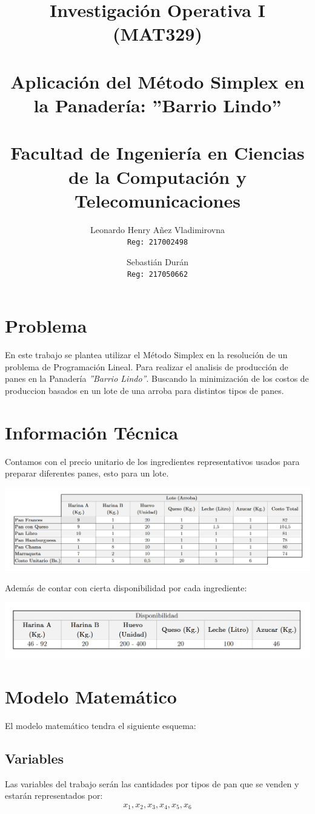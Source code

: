 \documentclass[10pt,letterpaper]{book}
\author{
Leonardo Henry Añez Vladimirovna\\
\texttt{Reg: 217002498}
\and
Sebastián Durán\\
\texttt{Reg: 217050662}
}
\title{
Investigación Operativa I (MAT329)\\ ${ }$\\
\textbf{Aplicación del Método Simplex en la Panadería: ''Barrio Lindo''}
\\ ${ }$\\
\small Facultad de Ingeniería en Ciencias de la Computación y Telecomunicaciones\\}
\begin{document}
\maketitle
\section*{Problema}
En este trabajo se plantea utilizar el Método Simplex en la resolución de un problema de Programación Lineal. Para realizar el analisis de producción de panes en la Panadería \textit{''Barrio Lindo''}. Buscando la minimización de los costos de produccion basados en un lote de una arroba para distintos tipos de panes.
\section*{Información Técnica}
Contamos con el precio unitario de los ingredientes representativos usados para preparar diferentes panes, esto para un lote.
\begin{center}
\includegraphics[scale=0.66]{Tabla}
\end{center}
Además de contar con cierta disponibilidad por cada ingrediente:
\begin{center}
\includegraphics[scale=0.66]{Tabla2}
\end{center}
\section*{Modelo Matemático}
El modelo matemático tendra el siguiente esquema:
\subsection*{Variables}
Las variables del trabajo serán las cantidades por tipos de pan que se venden y estarán representados por:
\begin{align*}
x_1,x_2,x_3,x_4,x_5,x_6
\end{align*}
\end{document}
